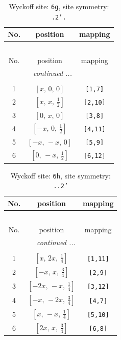 \documentclass[fleqn,8pt]{jsarticle}
\begin{document}
\renewcommand{\arraystretch}{1.2}
\begin{longtable}{ccc}
\caption{Wyckoff site: {\tt 6g}, site symmetry: {\tt .2'.}}
 \\
 \hline \hline
No. & position & mapping \\ \hline \endfirsthead

\multicolumn{2}{l}{\tablename\ \thetable{}} \\
 \hline \hline
No. & position & mapping \\ \hline \endhead

 \hline \hline
\multicolumn{2}{r}{\footnotesize\it continued ...} \\ \endfoot

 \hline \hline
\multicolumn{2}{r}{} \\ \endlastfoot

1 & $\left[ x,\, 0,\, 0 \right]$ & {\tt [1,7]} \\ \hline
2 & $\left[ x,\, x,\, \frac{1}{2} \right]$ & {\tt [2,10]} \\ \hline
3 & $\left[ 0,\, x,\, 0 \right]$ & {\tt [3,8]} \\ \hline
4 & $\left[ - x,\, 0,\, \frac{1}{2} \right]$ & {\tt [4,11]} \\ \hline
5 & $\left[ - x,\, - x,\, 0 \right]$ & {\tt [5,9]} \\ \hline
6 & $\left[ 0,\, - x,\, \frac{1}{2} \right]$ & {\tt [6,12]} \\
\end{longtable}
\renewcommand{\arraystretch}{1.2}
\begin{longtable}{ccc}
\caption{Wyckoff site: {\tt 6h}, site symmetry: {\tt ..2'}}
 \\
 \hline \hline
No. & position & mapping \\ \hline \endfirsthead

\multicolumn{2}{l}{\tablename\ \thetable{}} \\
 \hline \hline
No. & position & mapping \\ \hline \endhead

 \hline \hline
\multicolumn{2}{r}{\footnotesize\it continued ...} \\ \endfoot

 \hline \hline
\multicolumn{2}{r}{} \\ \endlastfoot

1 & $\left[ x,\, 2 x,\, \frac{1}{4} \right]$ & {\tt [1,11]} \\ \hline
2 & $\left[ - x,\, x,\, \frac{3}{4} \right]$ & {\tt [2,9]} \\ \hline
3 & $\left[ - 2 x,\, - x,\, \frac{1}{4} \right]$ & {\tt [3,12]} \\ \hline
4 & $\left[ - x,\, - 2 x,\, \frac{3}{4} \right]$ & {\tt [4,7]} \\ \hline
5 & $\left[ x,\, - x,\, \frac{1}{4} \right]$ & {\tt [5,10]} \\ \hline
6 & $\left[ 2 x,\, x,\, \frac{3}{4} \right]$ & {\tt [6,8]} \\
\end{longtable}
\end{document}
